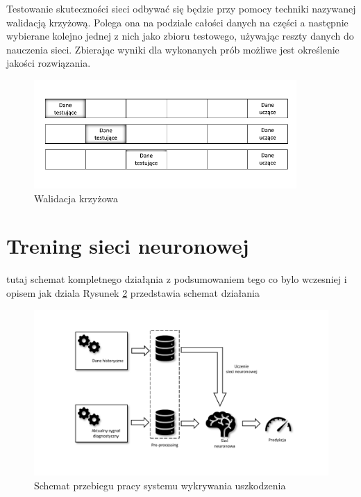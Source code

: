 \documentclass[inzynierska]{pwr_wmat_praca_dyplomowa}
\theoremstyle{plain}
\numberwithin{theorem}{chapter}
\theoremstyle{definition}
\numberwithin{theorem}{chapter}
\begin{document}
Testowanie skuteczności sieci odbywać się będzie przy pomocy techniki nazywanej walidacją krzyżową. Polega ona na podziale całości danych na części a następnie wybierane kolejno jednej z nich jako zbioru testowego, używając reszty danych do nauczenia sieci. Zbierając wyniki dla wykonanych prób możliwe jest określenie jakości rozwiązania. 
\begin{figure}[ht]
	\centering
	\includegraphics[width=10cm]{images/walidacja_c.pdf}
	\caption{Walidacja krzyżowa}
	\label{cross-validation}
\end{figure}

\section{Trening sieci neuronowej}
tutaj schemat kompletnego działąnia z podsumowaniem tego co bylo wczesniej i opisem jak dziala
Rysunek \ref{proces-caly} przedstawia schemat działania
\begin{figure}[ht]
	\centering
	\includegraphics[width=16cm]{images/total_proc.pdf}
	\caption{Schemat przebiegu pracy systemu wykrywania uszkodzenia}
	\label{proces-caly}
\end{figure}
\end{document}
